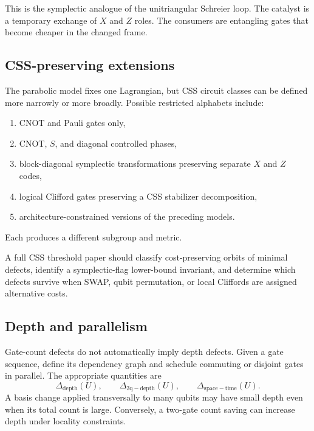 This is the symplectic analogue of the unitriangular Schreier loop.  The catalyst is a temporary exchange of $X$ and $Z$ roles.  The consumers are entangling gates that become cheaper in the changed frame.

\subsection{CSS-preserving extensions}
The parabolic model fixes one Lagrangian, but CSS circuit classes can be defined more narrowly or more broadly.  Possible restricted alphabets include:
\begin{enumerate}
\item CNOT and Pauli gates only,
\item CNOT, $S$, and diagonal controlled phases,
\item block-diagonal symplectic transformations preserving separate $X$ and $Z$ codes,
\item logical Clifford gates preserving a CSS stabilizer decomposition,
\item architecture-constrained versions of the preceding models.
\end{enumerate}
Each produces a different subgroup and metric.

\begin{skeletonbox}
A full CSS threshold paper should classify cost-preserving orbits of minimal defects, identify a symplectic-flag lower-bound invariant, and determine which defects survive when SWAP, qubit permutation, or local Cliffords are assigned alternative costs.
\end{skeletonbox}

\subsection{Depth and parallelism}
Gate-count defects do not automatically imply depth defects.  Given a gate sequence, define its dependency graph and schedule commuting or disjoint gates in parallel.  The appropriate quantities are
\[
\Delta_{\mathrm{depth}}(U),
\qquad
\Delta_{\mathrm{2q-depth}}(U),
\qquad
\Delta_{\mathrm{space-time}}(U).
\]
A basis change applied transversally to many qubits may have small depth even when its total count is large.  Conversely, a two-gate count saving can increase depth under locality constraints.

